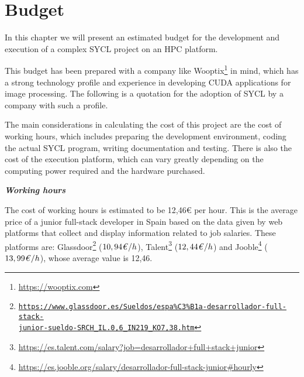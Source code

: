 %
%
%

\chapter{Budget} \label{chap:Budget} 

In this chapter we will present an estimated budget for the development and execution of a complex SYCL project on an HPC platform.

This budget has been prepared with a company like Wooptix\footnote{\url{https://wooptix.com}} in mind, which has a strong technology profile and experience in developing CUDA applications for image processing. The following is a quotation for the adoption of SYCL by a company with such a profile.

The main considerations in calculating the cost of this project are the cost of working hours, which includes preparing the development environment, coding the actual SYCL program, writing documentation and testing.
There is also the cost of the execution platform, which can vary greatly depending on the computing power required and the hardware purchased.

\vspace{5mm}
\textsl{\textbf{{Working hours}}}
\vspace{2mm}

The cost of working hours is estimated to be 12,46€ per hour.
This is the average price of a junior full-stack developer in Spain based on the data given by web platforms that collect and display information related to job salaries.
These platforms are: Glassdoor\footnote{\href{https://www.glassdoor.es/Sueldos/espa\%C3\%B1a-desarrollador-full-stack-junior-sueldo-SRCH_IL.0,6_IN219_KO7,38.htm}{\texttt{https://www.glassdoor.es/Sueldos/espa\%C3\%B1a-desarrollador-full-stack-\\junior-sueldo-SRCH\_IL.0,6\_IN219\_KO7,38.htm}}} (\(10,94\text{\textit{€}}/h\)), Talent\footnote{\url{https://es.talent.com/salary?job=desarrollador+full+stack+junior}} (\(12,44\text{\textit{€}}/h\)) and Jooble\footnote{\url{https://es.jooble.org/salary/desarrollador-full-stack-junior\#hourly}} (\(13,99\text{\textit{€}}/h\)), whose average value is 12,46.

